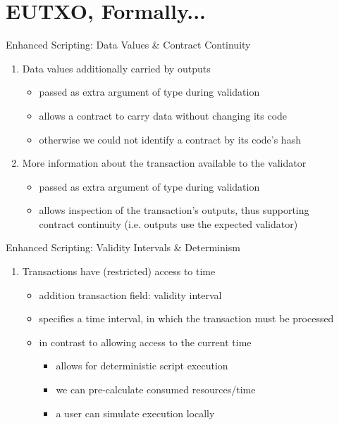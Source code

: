 \section{EUTXO, Formally...}

\begin{frame}{Enhanced Scripting: Data Values \& Contract Continuity}

\begin{enumerate}
\item \alert{Data values} additionally carried by outputs
  \begin{itemize}
  \item passed as extra argument of type  during validation
  \item allows a contract to carry data without changing its code
  \item otherwise we could not identify a contract by its code's hash
  \end{itemize}
\item More information about the transaction available to the validator
  \begin{itemize}
  \item passed as extra argument of type  during validation
  \item allows inspection of the transaction's outputs, thus supporting\\
\alert{contract continuity} (i.e. outputs use the expected validator)
  \end{itemize}
\seti
\end{enumerate}

\end{frame}

\begin{frame}{Enhanced Scripting: Validity Intervals \& Determinism}

\begin{enumerate}
\conti
\item Transactions have (restricted) access to time
  \begin{itemize}
  \item addition transaction field: \alert{validity interval}
  \item specifies a time interval, in which the transaction must be processed
  \item in contrast to allowing access to the current time
    \begin{itemize}
    \item allows for \alert{deterministic} script execution
    \item we can pre-calculate consumed resources/time
    \item a user can simulate execution locally
    \end{itemize}
  \end{itemize}
\end{enumerate}

\end{frame}



